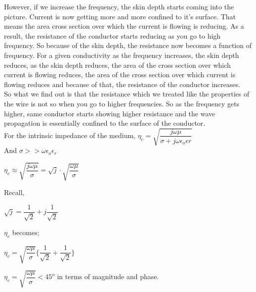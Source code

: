 		However, if we increase the frequency, the skin depth starts coming into the picture. Current is now getting more and more confined to it's surface. That means the area cross section over which the current is flowing is reducing. As a result, the resistance of the conductor starts reducing as you go to high frequency. So because of the skin depth, the resistance now becomes a function of frequency. For a given conductivity as the frequency increases, the skin depth reduces, as the skin depth reduces, the area of the cross section over which current is flowing reduces, the area of the cross section over which current is flowing reduces and because of that, the resistance of the conductor increases.\\
		
		So what we find out is that the resistance which we treated like the properties of the wire is not so when you go to higher frequencies. So as the frequency gets higher, same conductor starts showing higher resistance and the wave propagation is essentially confined to the surface of the conductor.\\
		For the intrinsic impedance of the medium, $\eta_{c}=\sqrt{\dfrac{j\omega\mu}{\sigma+j\omega\epsilon_{o}\epsilon{r}}}$\\
		
		And $\sigma>>\omega\epsilon_{o}\epsilon_{r}$\newline
		
		\begin{center}
		$\eta_{c}\approx\sqrt{\dfrac{j\omega\mu}{\sigma}}=\sqrt{j}\cdot\sqrt{\dfrac{\omega\mu}{\sigma}}$
	\end{center}
		
		Recall, \newline
		
		\begin{center}
		$\sqrt{j}=\dfrac{1}{\sqrt{2}}+j\dfrac{1}{\sqrt{2}}$
	\end{center}
		
		$\eta_{c}$ becomes;\newline
		
		\begin{center}
		$\eta_{c}=\sqrt{\dfrac{\omega\mu}{\sigma}}\Bigg\{\dfrac{1}{\sqrt{2}}+\dfrac{1}{\sqrt{2}}\Bigg\}$
	\end{center} 
		
		\begin{center}
		$\eta_{c}=\sqrt{\dfrac{\omega\mu}{\sigma}}<45^{o}$ in terms of magnitude and phase.
		\end{center}
		
